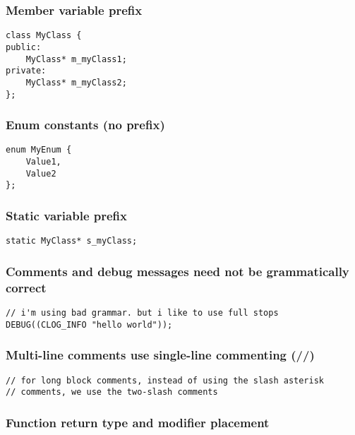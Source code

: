 \subsubsection{Member variable prefix}

\begin{verbatim}
class MyClass {
public:
    MyClass* m_myClass1;
private:
    MyClass* m_myClass2;
};
\end{verbatim}

\subsubsection{Enum constants (no prefix)}

\begin{verbatim}
enum MyEnum {
    Value1,
    Value2
};
\end{verbatim}

\subsubsection{Static variable prefix}

\begin{verbatim}
static MyClass* s_myClass;
\end{verbatim}

\subsubsection{Comments and debug messages need not be grammatically correct}

\begin{verbatim}
// i'm using bad grammar. but i like to use full stops
DEBUG((CLOG_INFO "hello world"));
\end{verbatim}

\subsubsection{Multi-line comments use single-line commenting (//)}

\begin{verbatim}
// for long block comments, instead of using the slash asterisk
// comments, we use the two-slash comments
\end{verbatim}

\subsubsection{Function return type and modifier placement}

